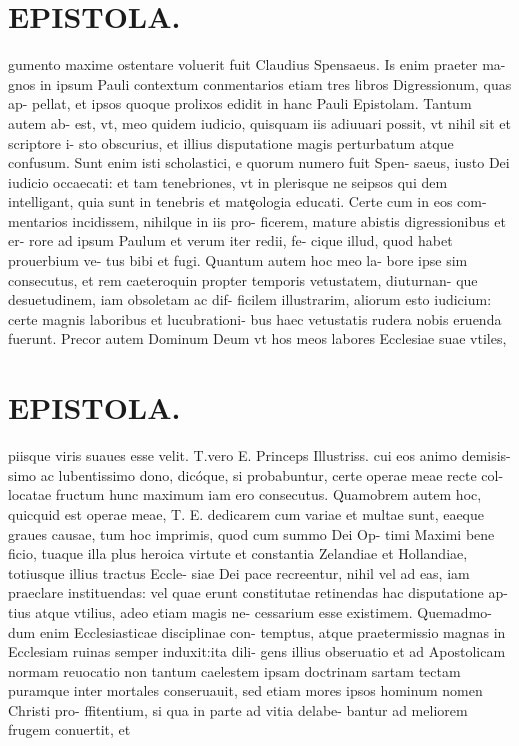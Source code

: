 \documentclass{article}
\begin{document}
\begin{pages}
\section*{EPISTOLA. }gumento maxime ostentare voluerit fuit Claudius Spensaeus. Is enim praeter ma- gnos in ipsum Pauli contextum conmentarios etiam tres libros Digressionum, quas ap- pellat, et ipsos quoque prolixos edidit in hanc Pauli Epistolam. Tantum autem ab- est, vt, meo quidem iudicio, quisquam iis adiuuari possit, vt nihil sit et scriptore i- sto obscurius, et illius disputatione magis perturbatum atque confusum. Sunt enim isti scholastici, e quorum numero fuit Spen- saeus, iusto Dei iudicio occaecati: et tam tenebriones, vt in plerisque ne seipsos qui dem intelligant, quia sunt in tenebris et matȩologia educati. Certe cum in eos com- mentarios incidissem, nihilque in iis pro- ficerem, mature abistis digressionibus et er- rore ad ipsum Paulum et verum iter redii, fe- cique illud, quod habet prouerbium ve- tus bibi et fugi. Quantum autem hoc meo la- bore ipse sim consecutus, et rem caeteroquin propter temporis vetustatem, diuturnan- que desuetudinem, iam obsoletam ac dif- ficilem illustrarim, aliorum esto iudicium: certe magnis laboribus et lucubrationi- bus haec vetustatis rudera nobis eruenda fuerunt. Precor autem Dominum Deum vt hos meos labores Ecclesiae suae vtiles, 
\section*{EPISTOLA. }piisque viris suaues esse velit. T.vero E. Princeps Illustriss. cui eos animo demisis- simo ac lubentissimo dono, dicóque, si probabuntur, certe operae meae recte col- locatae fructum hunc maximum iam ero consecutus. Quamobrem autem hoc, quicquid est operae meae, T. E. dedicarem cum variae et multae sunt, eaeque graues causae, tum hoc imprimis, quod cum summo Dei Op- timi Maximi bene ficio, tuaque illa plus heroica virtute et constantia Zelandiae et Hollandiae, totiusque illius tractus Eccle- siae Dei pace recreentur, nihil vel ad eas, iam praeclare instituendas: vel quae erunt constitutae retinendas hac disputatione ap- tius atque vtilius, adeo etiam magis ne- cessarium esse existimem. Quemadmo- dum enim Ecclesiasticae disciplinae con- temptus, atque praetermissio magnas in Ecclesiam ruinas semper induxit:ita dili- gens illius obseruatio et ad Apostolicam normam reuocatio non tantum caelestem ipsam doctrinam sartam tectam puramque inter mortales conseruauit, sed etiam mores ipsos hominum nomen Christi pro- ffitentium, si qua in parte ad vitia delabe- bantur ad meliorem frugem conuertit, et 

\end{pages}
\end{document}
